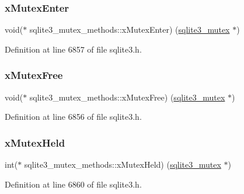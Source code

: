 \subsubsection{\texorpdfstring{x\+Mutex\+Enter}{xMutexEnter}}
{\footnotesize\ttfamily void($\ast$ sqlite3\+\_\+mutex\+\_\+methods\+::x\+Mutex\+Enter) (\mbox{\hyperlink{sqlite3_8h_a0f546860bde03fddb33a9fed920da05c}{sqlite3\+\_\+mutex}} $\ast$)}



Definition at line 6857 of file sqlite3.\+h.

\mbox{\label{structsqlite3__mutex__methods_a632046a2d4a6372a567a5ac5e8175b30}} 
\subsubsection{\texorpdfstring{x\+Mutex\+Free}{xMutexFree}}
{\footnotesize\ttfamily void($\ast$ sqlite3\+\_\+mutex\+\_\+methods\+::x\+Mutex\+Free) (\mbox{\hyperlink{sqlite3_8h_a0f546860bde03fddb33a9fed920da05c}{sqlite3\+\_\+mutex}} $\ast$)}



Definition at line 6856 of file sqlite3.\+h.

\mbox{\label{structsqlite3__mutex__methods_a71a26118133388426ddf18ab59ce87f5}} 
\subsubsection{\texorpdfstring{x\+Mutex\+Held}{xMutexHeld}}
{\footnotesize\ttfamily int($\ast$ sqlite3\+\_\+mutex\+\_\+methods\+::x\+Mutex\+Held) (\mbox{\hyperlink{sqlite3_8h_a0f546860bde03fddb33a9fed920da05c}{sqlite3\+\_\+mutex}} $\ast$)}



Definition at line 6860 of file sqlite3.\+h.

\mbox{\label{structsqlite3__mutex__methods_a1a163f0e0eaed85223b1537434df635a}} 
